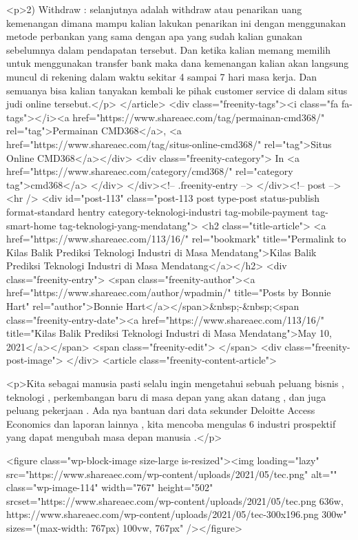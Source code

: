 <p>2) Withdraw : selanjutnya adalah withdraw atau penarikan uang kemenangan dimana mampu kalian lakukan penarikan ini dengan menggunakan metode perbankan yang sama dengan apa yang sudah kalian gunakan sebelumnya dalam pendapatan tersebut. Dan ketika kalian memang memilih untuk menggunakan transfer bank maka dana kemenangan kalian akan langsung muncul di rekening dalam waktu sekitar 4 sampai 7 hari masa kerja. Dan semuanya bisa kalian tanyakan kembali ke pihak customer service di dalam situs judi online tersebut.</p>
									</article>
																			<div class="freenity-tags"><i class="fa fa-tags"></i><a href="https://www.shareaec.com/tag/permainan-cmd368/" rel="tag">Permainan CMD368</a>, <a href="https://www.shareaec.com/tag/situs-online-cmd368/" rel="tag">Situs Online CMD368</a></div>
																			<div class="freenity-category">
											In <a href="https://www.shareaec.com/category/cmd368/" rel="category tag">cmd368</a>										</div>
																	</div><!-- .freenity-entry -->
							</div><!-- post -->
							<hr />
													<div id="post-113" class="post-113 post type-post status-publish format-standard hentry category-teknologi-industri tag-mobile-payment tag-smart-home tag-teknologi-yang-mendatang">
								<h2 class="title-article">
									<a href="https://www.shareaec.com/113/16/" rel="bookmark" title="Permalink to Kilas Balik Prediksi Teknologi Industri di Masa Mendatang">Kilas Balik Prediksi Teknologi Industri di Masa Mendatang</a></h2>
								<div class="freenity-entry">
									<span class="freenity-author"><a href="https://www.shareaec.com/author/wpadmin/" title="Posts by Bonnie Hart" rel="author">Bonnie Hart</a></span>&nbsp;-&nbsp;<span class="freenity-entry-date"><a href="https://www.shareaec.com/113/16/" title="Kilas Balik Prediksi Teknologi Industri di Masa Mendatang">May 10, 2021</a></span>
									<span class="freenity-edit"> </span>
									<div class="freenity-post-image">  </div>
																		<article class="freenity-content-article">
										
<p>Kita sebagai manusia pasti selalu ingin mengetahui sebuah peluang bisnis , teknologi , perkembangan baru di masa depan yang akan datang , dan juga peluang pekerjaan . Ada nya bantuan dari data sekunder Deloitte Access Economics dan laporan lainnya , kita mencoba mengulas 6 industri prospektif yang dapat mengubah masa depan manusia .</p>



<figure class="wp-block-image size-large is-resized"><img loading="lazy" src="https://www.shareaec.com/wp-content/uploads/2021/05/tec.png" alt="" class="wp-image-114" width="767" height="502" srcset="https://www.shareaec.com/wp-content/uploads/2021/05/tec.png 636w, https://www.shareaec.com/wp-content/uploads/2021/05/tec-300x196.png 300w" sizes="(max-width: 767px) 100vw, 767px" /></figure>



